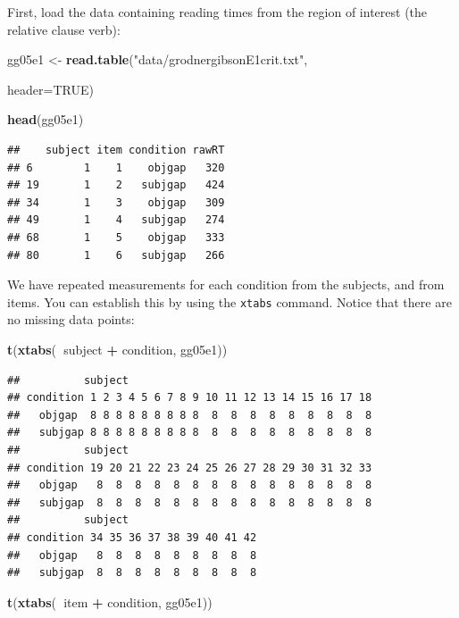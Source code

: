 \documentclass[12pt,]{krantz}
\newenvironment{Shaded}{\begin{snugshade}}{\end{snugshade}}
\newcommand{\DataTypeTok}[1]{\textcolor[rgb]{0.13,0.29,0.53}{#1}}
\newcommand{\KeywordTok}[1]{\textcolor[rgb]{0.13,0.29,0.53}{\textbf{#1}}}
\newcommand{\NormalTok}[1]{#1}
\newcommand{\OperatorTok}[1]{\textcolor[rgb]{0.81,0.36,0.00}{\textbf{#1}}}
\newcommand{\OtherTok}[1]{\textcolor[rgb]{0.56,0.35,0.01}{#1}}
\newcommand{\StringTok}[1]{\textcolor[rgb]{0.31,0.60,0.02}{#1}}
\begin{document}
First, load the data containing reading times from the region of interest (the relative clause verb):

\begin{Shaded}
\begin{Highlighting}[]
\NormalTok{gg05e1 <-}\StringTok{ }\KeywordTok{read.table}\NormalTok{(}\StringTok{"data/grodnergibsonE1crit.txt"}\NormalTok{,}
                     
                     \DataTypeTok{header=}\OtherTok{TRUE}\NormalTok{)}

\KeywordTok{head}\NormalTok{(gg05e1)}
\end{Highlighting}
\end{Shaded}

\begin{verbatim}
##    subject item condition rawRT
## 6        1    1    objgap   320
## 19       1    2   subjgap   424
## 34       1    3    objgap   309
## 49       1    4   subjgap   274
## 68       1    5    objgap   333
## 80       1    6   subjgap   266
\end{verbatim}

We have repeated measurements for each condition from the subjects, and from items. You can establish this by using the \texttt{xtabs} command.
Notice that there are no missing data points:

\begin{Shaded}
\begin{Highlighting}[]
\KeywordTok{t}\NormalTok{(}\KeywordTok{xtabs}\NormalTok{(}\OperatorTok{~}\NormalTok{subject }\OperatorTok{+}\StringTok{ }\NormalTok{condition, gg05e1))}
\end{Highlighting}
\end{Shaded}

\begin{verbatim}
##          subject
## condition 1 2 3 4 5 6 7 8 9 10 11 12 13 14 15 16 17 18
##   objgap  8 8 8 8 8 8 8 8 8  8  8  8  8  8  8  8  8  8
##   subjgap 8 8 8 8 8 8 8 8 8  8  8  8  8  8  8  8  8  8
##          subject
## condition 19 20 21 22 23 24 25 26 27 28 29 30 31 32 33
##   objgap   8  8  8  8  8  8  8  8  8  8  8  8  8  8  8
##   subjgap  8  8  8  8  8  8  8  8  8  8  8  8  8  8  8
##          subject
## condition 34 35 36 37 38 39 40 41 42
##   objgap   8  8  8  8  8  8  8  8  8
##   subjgap  8  8  8  8  8  8  8  8  8
\end{verbatim}

\begin{Shaded}
\begin{Highlighting}[]
\KeywordTok{t}\NormalTok{(}\KeywordTok{xtabs}\NormalTok{(}\OperatorTok{~}\NormalTok{item }\OperatorTok{+}\StringTok{ }\NormalTok{condition, gg05e1))}
\end{Highlighting}
\end{Shaded}
\end{document}
